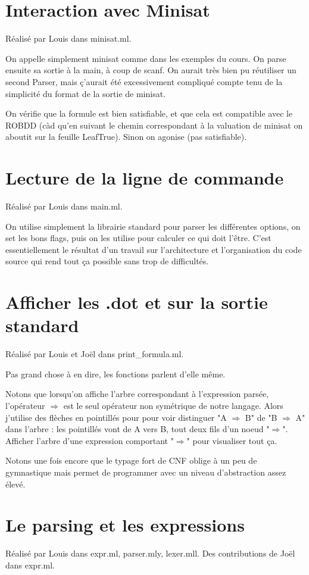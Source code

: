 \documentclass[a4paper,10pt]{article}
\begin{document}
\section{Interaction avec Minisat}
Réalisé par Louis dans minisat.ml.

On appelle simplement minisat comme dans les exemples du cours. On parse ensuite sa sortie à la main, à coup de scanf. On aurait très bien pu réutiliser un second Parser, 
mais ç'aurait été excessivement compliqué compte tenu de la simplicité du format de la sortie de minisat.  
  
On vérifie que la formule est bien satisfiable, et que cela est compatible avec le ROBDD (càd qu'en suivant le chemin correspondant à la valuation de minisat on aboutit sur la feuille LeafTrue). 
Sinon on agonise (pas satisfiable).

\section{Lecture de la ligne de commande}
Réalisé par Louis dans main.ml.

On utilise simplement la librairie standard pour parser les différentes options, on set les bons flags, puis on les utilise pour calculer ce qui doit l'être. 
C'est essentiellement le résultat d'un travail sur l'architecture et l'organisation du code source qui rend tout ça possible sans trop de difficultés.

\section{Afficher les .dot et sur la sortie standard}
Réalisé par Louis et Joël dans print\_formula.ml.

Pas grand chose à en dire, les fonctions parlent d'elle même.

Notons que lorsqu'on affiche l'arbre correspondant à l'expression parsée, l'opérateur $\Rightarrow$ est le seul opérateur non symétrique de notre langage. 
Alors j'utilise des flèches en pointillés pour pour voir distinguer "A $\Rightarrow$ B" de "B $\Rightarrow$ A" dans l'arbre : les pointillés vont de A vers B, tout deux fils d'un noeud "$\Rightarrow$". 
Afficher l'arbre d'une expression comportant "$\Rightarrow$" pour visualiser tout ça.

Notons une fois encore que le typage fort de CNF oblige à un peu de gymnastique mais permet de programmer avec un niveau d'abstraction assez élevé.

\section{Le parsing et les expressions}
Réalisé par Louis dans expr.ml, parser.mly, lexer.mll. Des contributions de Joël dans expr.ml.
\end{document}
